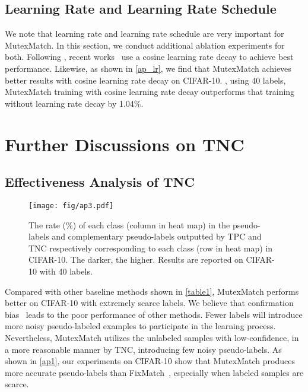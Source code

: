 \documentclass[lettersize,journal]{IEEEtran}
\theoremstyle{plain}
\theoremstyle{definition}
\theoremstyle{remark}
\begin{document}
\subsection{Learning Rate and Learning Rate Schedule}
We note that learning rate and learning rate schedule are very important for MutexMatch. 
In this section, we conduct additional ablation experiments for both. 
Following \cite{loshchilov2016sgdr}, recent works~\cite{sohn2020fixmatch,li2021comatch} use a cosine learning rate decay to achieve best performance. 
Likewise, as shown  in \cref{ap_lr}, we find that MutexMatch achieves better results with cosine learning rate decay on CIFAR-10. 
\eg, using 40 labels, MutexMatch training with cosine learning rate decay outperforms that training without learning rate decay by 1.04\%. 

\section{Further Discussions on TNC}
\label{sec:fd}

\subsection{Effectiveness Analysis of TNC}
\label{sec:atnc}
\begin{figure*}[t]
\begin{center}
      \end{center}
    \centering
    \texttt{[image: fig/ap3.pdf]}
\caption{The rate (\%) of each class (column in heat map) in the pseudo-labels and complementary pseudo-labels outputted by TPC and TNC respectively corresponding to each class (row in heat map) in CIFAR-10. The darker, the higher. 
   Results are reported on CIFAR-10 with 40 labels.} 
   \label{dis}
\vskip 0in
\end{figure*}

Compared with other baseline methods shown  in \cref{table1}, 
MutexMatch performs better on CIFAR-10 with extremely scarce labels. 
We believe that confirmation bias~\cite{yu2018learning} leads to the poor
performance of other methods. Fewer labels will introduce more noisy pseudo-labeled examples to participate in the learning process. 
Nevertheless, MutexMatch utilizes the unlabeled samples with low-confidence, in a more reasonable manner by TNC, introducing few noisy pseudo-labels.
As shown in \cref{ap1}, our experiments on CIFAR-10 show that MutexMatch produces more accurate pseudo-labels than FixMatch~\cite{sohn2020fixmatch}, especially when labeled samples are scarce.
\end{document}
